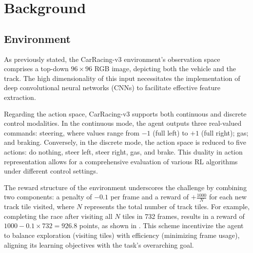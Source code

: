 \documentclass[../CSC_52081_EP.tex]{subfiles}
\begin{document}
    \section{Background}
    \label{sec:background}




    \subsection{Environment}

    As previously stated, the CarRacing-v3 environment's observation space comprises a top-down \(96\times96\) RGB image, depicting both the vehicle and the track. The high dimensionality of this input necessitates the implementation of deep convolutional neural networks (CNNs) to facilitate effective feature extraction.

    Regarding the action space, CarRacing-v3 supports both continuous and discrete control modalities. In the continuous mode, the agent outputs three real-valued commands: steering, where values range from \(-1\) (full left) to \(+1\) (full right); gas; and braking. Conversely, in the discrete mode, the action space is reduced to five actions: do nothing, steer left, steer right, gas, and brake. This duality in action representation allows for a comprehensive evaluation of various RL algorithms under different control settings.

    The reward structure of the environment underscores the challenge by combining two components: a penalty of \(-0.1\) per frame and a reward of \(+\frac{1000}{N}\) for each new track tile visited, where \(N\) represents the total number of track tiles. For example, completing the race after visiting all \(N\) tiles in 732 frames, results in a reward of \(1000 - 0.1 \times 732 = 926.8\) points, as shown in \cite{gymnasium}. This scheme incentivize the agent to balance exploration (visiting tiles) with efficiency (minimizing frame usage), aligning its learning objectives with the task's overarching goal.
\end{document}
